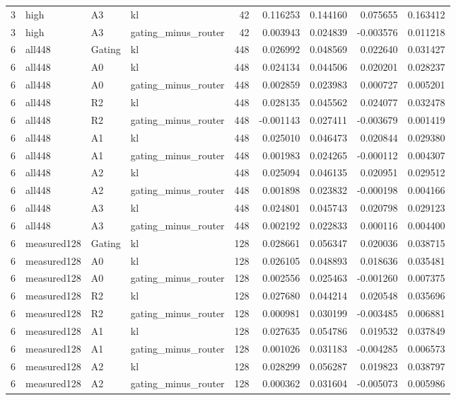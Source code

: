 \begin{tabular}{rlllrrrrr}
3 & high & A3 & kl & 42 & 0.116253 & 0.144160 & 0.075655 & 0.163412 \\
3 & high & A3 & gating_minus_router & 42 & 0.003943 & 0.024839 & -0.003576 & 0.011218 \\
6 & all448 & Gating & kl & 448 & 0.026992 & 0.048569 & 0.022640 & 0.031427 \\
6 & all448 & A0 & kl & 448 & 0.024134 & 0.044506 & 0.020201 & 0.028237 \\
6 & all448 & A0 & gating_minus_router & 448 & 0.002859 & 0.023983 & 0.000727 & 0.005201 \\
6 & all448 & R2 & kl & 448 & 0.028135 & 0.045562 & 0.024077 & 0.032478 \\
6 & all448 & R2 & gating_minus_router & 448 & -0.001143 & 0.027411 & -0.003679 & 0.001419 \\
6 & all448 & A1 & kl & 448 & 0.025010 & 0.046473 & 0.020844 & 0.029380 \\
6 & all448 & A1 & gating_minus_router & 448 & 0.001983 & 0.024265 & -0.000112 & 0.004307 \\
6 & all448 & A2 & kl & 448 & 0.025094 & 0.046135 & 0.020951 & 0.029512 \\
6 & all448 & A2 & gating_minus_router & 448 & 0.001898 & 0.023832 & -0.000198 & 0.004166 \\
6 & all448 & A3 & kl & 448 & 0.024801 & 0.045743 & 0.020798 & 0.029123 \\
6 & all448 & A3 & gating_minus_router & 448 & 0.002192 & 0.022833 & 0.000116 & 0.004400 \\
6 & measured128 & Gating & kl & 128 & 0.028661 & 0.056347 & 0.020036 & 0.038715 \\
6 & measured128 & A0 & kl & 128 & 0.026105 & 0.048893 & 0.018636 & 0.035481 \\
6 & measured128 & A0 & gating_minus_router & 128 & 0.002556 & 0.025463 & -0.001260 & 0.007375 \\
6 & measured128 & R2 & kl & 128 & 0.027680 & 0.044214 & 0.020548 & 0.035696 \\
6 & measured128 & R2 & gating_minus_router & 128 & 0.000981 & 0.030199 & -0.003485 & 0.006881 \\
6 & measured128 & A1 & kl & 128 & 0.027635 & 0.054786 & 0.019532 & 0.037849 \\
6 & measured128 & A1 & gating_minus_router & 128 & 0.001026 & 0.031183 & -0.004285 & 0.006573 \\
6 & measured128 & A2 & kl & 128 & 0.028299 & 0.056287 & 0.019823 & 0.038797 \\
6 & measured128 & A2 & gating_minus_router & 128 & 0.000362 & 0.031604 & -0.005073 & 0.005986 \\

\end{tabular}
